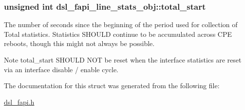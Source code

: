 \hypertarget{structdsl__fapi__line__stats__obj_abf7d09535ce7e6ac6b380bdb52b10558}{
\subsubsection[{total\-\_\-start}]{\setlength{\rightskip}{0pt plus 5cm}unsigned int dsl\-\_\-fapi\-\_\-line\-\_\-stats\-\_\-obj\-::total\-\_\-start}}\label{structdsl__fapi__line__stats__obj_abf7d09535ce7e6ac6b380bdb52b10558}
The number of seconds since the beginning of the period used for collection of Total statistics. Statistics S\-H\-O\-U\-L\-D continue to be accumulated across C\-P\-E reboots, though this might not always be possible. \begin{DoxyNote}{Note}
total\-\_\-start S\-H\-O\-U\-L\-D N\-O\-T be reset when the interface statistics are reset via an interface disable / enable cycle. 
\end{DoxyNote}


The documentation for this struct was generated from the following file\-:\begin{DoxyCompactItemize}
\item 
\hyperlink{dsl__fapi_8h}{dsl\-\_\-fapi.\-h}\end{DoxyCompactItemize}

